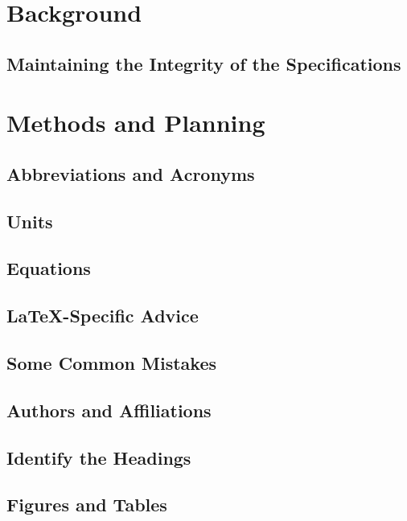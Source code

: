 \documentclass[conference]{IEEEtran}
\begin{document}
\section{Background}

\subsection{Maintaining the Integrity of the Specifications}


\section{Methods and Planning}


\subsection{Abbreviations and Acronyms}\label{AA}

\subsection{Units}


\subsection{Equations}


\subsection{\LaTeX-Specific Advice}


\subsection{Some Common Mistakes}\label{SCM}

\subsection{Authors and Affiliations}

\subsection{Identify the Headings}

\subsection{Figures and Tables}
\end{document}
